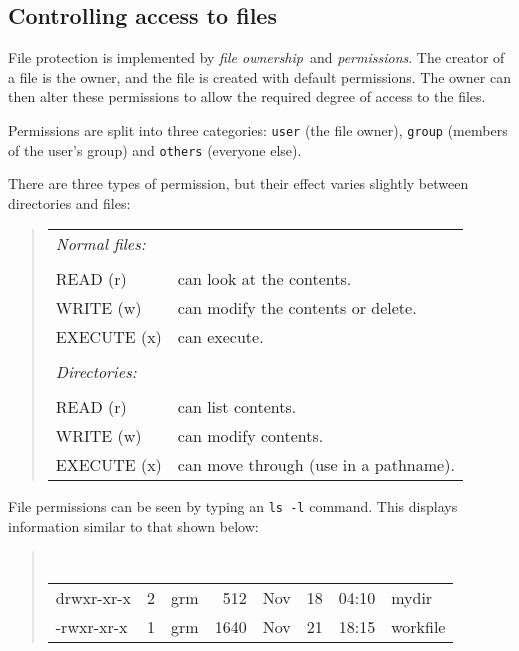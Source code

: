 \subsection{Controlling access to files}

File protection is implemented by {\em file ownership}\, and {\em permissions}.
The creator of a file is the owner, and the file is created with default
permissions.
The owner can then alter these permissions to allow the required degree of
access to the files.

Permissions are split into three categories: {\tt user} (the file
owner), {\tt group} (members of the user's group) and {\tt others}
(everyone else).

There are three types of permission, but their effect varies slightly between
directories and files:
\begin{quote}
\begin{tabular}{lp{4.5in}}
 {\em Normal files:} &\\
&\\
 READ (r) &  can look at the contents. \\

 WRITE (w)& can modify the contents or delete.\\

 EXECUTE (x) & can execute.\\
&\\

 {\em Directories:} &\\
&\\

 READ (r) & can list contents.\\

 WRITE (w) & can modify contents.\\ 

 EXECUTE (x) & can move through (use in a pathname).

\end{tabular}
\end{quote}

File permissions can be seen by typing an {\tt ls -l} command.
This displays information similar to that shown below:
\begin{quote}
{\tt
\begin{tabular}{l l l r l r l l}
drwxr-xr-x &2& grm& 512& Nov& 18& 04:10& mydir \\
-rwxr-xr-x &1 &grm &1640 &Nov &21 &18:15 &workfile 
\end{tabular}
}
\end{quote}

